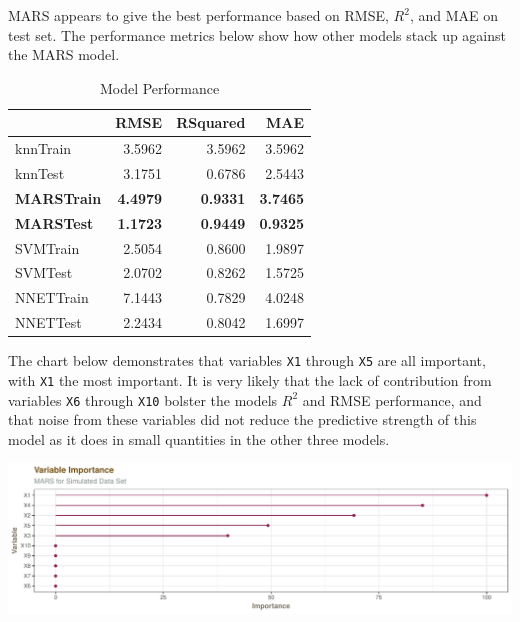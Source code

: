 \documentclass[]{report}
\begin{document}
MARS appears to give the best performance based on RMSE, \(R^2\), and
MAE on test set. The performance metrics below show how other models
stack up against the MARS model.

\begin{table}[H]

\caption{\label{tab:unnamed-chunk-1}Model Performance}
\centering
\fontsize{8}{10}\selectfont
\begin{tabular}[t]{l|r|r|r}
\hline
\textbf{ } & \textbf{RMSE} & \textbf{RSquared} & \textbf{MAE}\\
\hline
\rowcolor{gray!6}  knnTrain & 3.5962 & 3.5962 & 3.5962\\
\hline
knnTest & 3.1751 & 0.6786 & 2.5443\\
\hline
\rowcolor{gray!6}  \rowcolor[HTML]{d9f2e6}  \textbf{MARSTrain} & \textbf{4.4979} & \textbf{0.9331} & \textbf{3.7465}\\
\hline
\rowcolor[HTML]{d9f2e6}  \textbf{MARSTest} & \textbf{1.1723} & \textbf{0.9449} & \textbf{0.9325}\\
\hline
\rowcolor{gray!6}  SVMTrain & 2.5054 & 0.8600 & 1.9897\\
\hline
SVMTest & 2.0702 & 0.8262 & 1.5725\\
\hline
\rowcolor{gray!6}  NNETTrain & 7.1443 & 0.7829 & 4.0248\\
\hline
NNETTest & 2.2434 & 0.8042 & 1.6997\\
\hline
\end{tabular}
\end{table}

The chart below demonstrates that variables \texttt{X1} through
\texttt{X5} are all important, with \texttt{X1} the most important. It
is very likely that the lack of contribution from variables \texttt{X6}
through \texttt{X10} bolster the models \(R^2\) and RMSE performance,
and that noise from these variables did not reduce the predictive
strength of this model as it does in small quantities in the other three
models.

\includegraphics{AppliedPredictiveModeling_treebased_regression_files/figure-latex/kj-7.2-4b-1.pdf}
\end{document}
